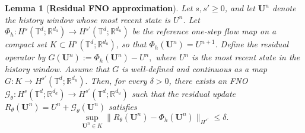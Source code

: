 \documentclass[11pt,a4paper]{article}
\newtheorem{lemma}[theorem]{Lemma}
\theoremstyle{definition}
\theoremstyle{remark}
\numberwithin{equation}{section}
\numberwithin{figure}{section}
\numberwithin{table}{section}
\begin{document}

\begin{lemma}[\textbf{Residual FNO approximation}]
\label{lem:residual_fno_approximation}
Let \(s,s'\ge 0\), and let \(\mathbf U^n\) denote the history window whose
most recent state is \(U^n\). Let
$
\Phi_h:H^s(\mathbb T^d;\mathbb R^{d_a})
\to H^{s'}(\mathbb T^d;\mathbb R^{d_u})
$
be the reference one-step flow map on a compact set
\(K\subset H^s(\mathbb T^d;\mathbb R^{d_a})\), so that
$
    \Phi_h(\mathbf U^n)=U^{n+1}.
$
Define the residual operator by
$
    G(\mathbf U^n):=\Phi_h(\mathbf U^n)-U^n,
$
where \(U^n\) is the most recent state in the history window. Assume that
\(G\) is well-defined and continuous as a map
$
    G:K\to H^{s'}(\mathbb T^d;\mathbb R^{d_u}).
$
Then, for every \(\delta>0\), there exists an FNO
$
\mathcal G_\theta:H^s(\mathbb T^d;\mathbb R^{d_a})
\to H^{s'}(\mathbb T^d;\mathbb R^{d_u})
$
such that the residual update
$
    R_\theta(\mathbf U^n)=U^n+\mathcal G_\theta(\mathbf U^n)
$
satisfies
\[
    \sup_{\mathbf U^n\in K}
    \|R_\theta(\mathbf U^n)-\Phi_h(\mathbf U^n)\|_{H^{s'}}
    \le \delta .
\]
\end{lemma}
\end{document}
